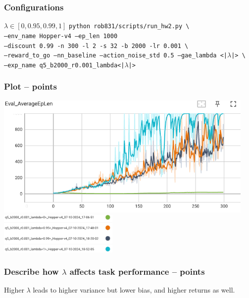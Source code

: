 \documentclass{article}
\begin{document}
\subsubsection{Configurations}
\begin{answer}[title=Q8.1.1,height=4cm,width=\linewidth]
$\lambda \in [0,0.95,0.99,1]$
\texttt{python rob831/scripts/run\_hw2.py \textbackslash}
\\
\texttt{\hspace{1cm}--env\_name Hopper-v4 --ep\_len 1000}
\\
\texttt{\hspace{1cm}--discount 0.99 -n 300 -l 2 -s 32 -b 2000 -lr 0.001 \textbackslash}
\\
\texttt{\hspace{1cm}--reward\_to\_go --nn\_baseline --action\_noise\_std 0.5 --gae\_lambda <|$\lambda$|> \textbackslash}
\\
\texttt{\hspace{1cm}--exp\_name q5\_b2000\_r0.001\_lambda<|$\lambda$|>}

\end{answer}

\subsubsection{Plot --  points\rbrack}
\begin{answer}[title=Q8.1.2,height=10cm,width=\linewidth]
\centering
\includegraphics[height=6cm]{hw2/8.1.2.png}
\includegraphics[height=2cm]{hw2/8.1.2l.png}
\end{answer}

\subsubsection{Describe how $\lambda$ affects task performance --  points\rbrack}
\begin{answer}[title=Q8.1.3,height=4cm,width=\linewidth]
Higher $\lambda$ leads to higher variance but lower bias, and higher returns as well.
\end{answer}
\end{document}
